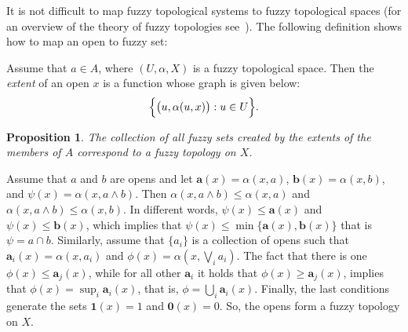 \documentclass[11pt]{article}
\newtheorem{proposition}[theorem]{Proposition}
\newenvironment{proof}[1][Proof]{\begin{trivlist}
\item[\hskip \labelsep {\bfseries #1}]}{\end{trivlist}}
\newenvironment{definition}[1][Definition]{\begin{trivlist}
\item[\hskip \labelsep {\bfseries #1}]}{\end{trivlist}}
\begin{document}
It is not difficult to map fuzzy topological systems to fuzzy topological spaces 
(for an overview of the theory of fuzzy topologies see~\cite{ying-ming97}). 
The following definition shows how to map an open to fuzzy set:
\begin{definition}
Assume that $a\in A$, where $(U,\alpha,X)$ is a fuzzy topological space. Then the 
{\em extent} of an open $x$ is a function whose graph is given below:
\begin{displaymath}
\Bigl\{ \bigl(u,\alpha(u,x) \bigr):u\in U\Bigr\}.
\end{displaymath}
\end{definition}
\begin{proposition}
The collection of all fuzzy sets created by the extents of the members of $A$ 
correspond to a fuzzy topology on $X$. 
\end{proposition}
\begin{proof}
Assume that $a$ and $b$ are opens and let $\mathbf{a}(x)=\alpha(x,a)$,
$\mathbf{b}(x)=\alpha(x,b)$, and $\psi(x)=\alpha(x,a\wedge b)$. Then 
$\alpha(x,a\wedge b)\le \alpha(x,a)$ and $\alpha(x,a\wedge b)\le \alpha(x,b)$. In
different words,  $\psi(x)\le\mathbf{a}(x)$ and $\psi(x)\le\mathbf{b}(x)$, which implies
that $\psi(x)\le\min\{\mathbf{a}(x),\mathbf{b}(x)\}$ that is $\psi=a\cap b$. 
Similarly, assume that $\{a_i\}$ is a collection of opens such that $\mathbf{a}_{i}(x)=\alpha(x,a_i)$
and $\phi(x)=\alpha(x,\bigvee_{i}a_i)$. The fact that there is one $\phi(x)\le\mathbf{a}_{j}(x)$,
while for all other $\mathbf{a}_{i}$ it holds that $\phi(x)\ge\mathbf{a}_{j}(x)$, implies that
$\phi(x)=\sup_{i}\mathbf{a}_{i}(x)$, that is, $\phi=\bigcup_{i}\mathbf{a}_i(x)$. Finally, the
last conditions generate the sets $\mathbf{1}(x)=1$ and $\mathbf{0}(x)=0$. So, the
opens form a fuzzy topology on $X$.
\end{proof}
\end{document}
